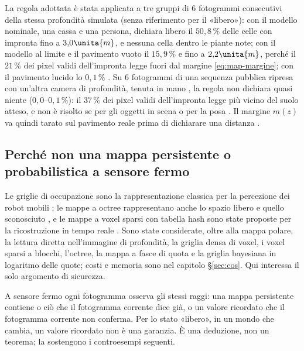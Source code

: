 La regola adottata è stata applicata a tre gruppi di 6 fotogrammi consecutivi della stessa profondità simulata (senza riferimento per il «libero»): con il modello nominale, una cassa e una persona, dichiara libero il $50{,}8\,\%$ delle celle con impronta fino a $3{,}0\unita{m}$, e nessuna cella dentro le piante note; con il modello al limite e il pavimento vuoto il $15{,}9\,\%$ e fino a $2{,}2\unita{m}$, perché il $21\,\%$ dei pixel validi dell'impronta legge fuori dal margine \eqref{eq:map-margine}; con il pavimento lucido lo $0{,}1\,\%$ . Su 6 fotogrammi di una sequenza pubblica ripresa con un'altra camera di profondità, tenuta in mano \cite{tum-rgbd}, la regola non dichiara quasi niente ($0{,}0$–$0{,}1\,\%$): il $37\,\%$ dei pixel validi dell'impronta legge più vicino del suolo atteso, e non è risolto se per gli oggetti in scena o per la posa . Il margine $m(z)$ va quindi tarato sul pavimento reale prima di dichiarare una distanza .

\subsection{Perché non una mappa persistente o probabilistica a sensore fermo}\label{sec:map-persistente}

Le griglie di occupazione sono la rappresentazione classica per la percezione dei robot mobili \cite{elfes1989}; le mappe a octree rappresentano anche lo spazio libero e quello sconosciuto \cite{hornung2013}, e le mappe a voxel sparsi con tabella hash sono state proposte per la ricostruzione in tempo reale \cite{niessner2013}. Sono state considerate, oltre alla mappa polare, la lettura diretta nell'immagine di profondità, la griglia densa di voxel, i voxel sparsi a blocchi, l'octree, la mappa a fasce di quota e la griglia bayesiana in logaritmo delle quote; costi e memoria sono nel capitolo \S\ref{sec:cos}. Qui interessa il solo argomento di sicurezza.

\begin{osservazione}\label{oss:map-fermo}
A sensore fermo ogni fotogramma osserva gli stessi raggi: una mappa persistente contiene o ciò che il fotogramma corrente dice già, o un valore ricordato che il fotogramma corrente non conferma. Per lo stato «libero», in un mondo che cambia, un valore ricordato non è una garanzia. È una deduzione, non un teorema; la sostengono i controesempi seguenti.
\end{osservazione}

